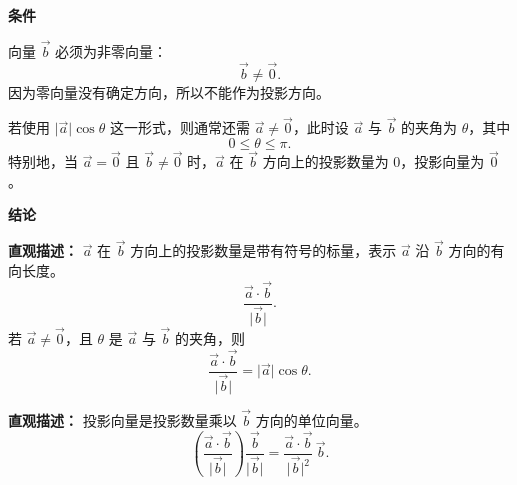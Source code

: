 \begin{statementbox}

	\textbf{\textcolor{CStatement}{条件}}
	\begin{description}[style=nextline, leftmargin=2.8em, labelsep=0.5em, itemsep=0.35em]
		\item[\textbf{\textcolor{CStatement}{条件1（投影方向非零）：}}] 向量 $\vec b$ 必须为非零向量：
		      \[
			      \vec b \neq \vec 0.
		      \]
		      因为零向量没有确定方向，所以不能作为投影方向。

		\item[\textbf{\textcolor{CStatement}{条件2（夹角公式前提）：}}] 若使用 $\lvert\vec a\rvert\cos\theta$ 这一形式，则通常还需 $\vec a\neq \vec 0$，此时设 $\vec a$ 与 $\vec b$ 的夹角为 $\theta$，其中
		      \[
			      0 \le \theta \le \pi.
		      \]
		      特别地，当 $\vec a=\vec 0$ 且 $\vec b\neq\vec 0$ 时，$\vec a$ 在 $\vec b$ 方向上的投影数量为 $0$，投影向量为 $\vec 0$。
	\end{description}

	\textbf{\textcolor{CStatement}{结论}}
	\begin{description}[style=nextline, leftmargin=2.8em, labelsep=0.5em, itemsep=0.45em]
		\item[\textbf{\textcolor{CStatement}{结论一（投影数量）：}}]
		      \textbf{\textcolor{CStatement}{直观描述：}} $\vec a$ 在 $\vec b$ 方向上的投影数量是带有符号的标量，表示 $\vec a$ 沿 $\vec b$ 方向的有向长度。
		      \[
			      \frac{\vec a\cdot\vec b}{\lvert\vec b\rvert}.
		      \]
		      若 $\vec a\neq\vec 0$，且 $\theta$ 是 $\vec a$ 与 $\vec b$ 的夹角，则
		      \[
			      \frac{\vec a\cdot\vec b}{\lvert\vec b\rvert}
			      =
			      \lvert\vec a\rvert\cos\theta .
		      \]

		\item[\textbf{\textcolor{CStatement}{推广结论（投影向量）：}}]
		      \textbf{\textcolor{CStatement}{直观描述：}} 投影向量是投影数量乘以 $\vec b$ 方向的单位向量。
		      \[
			      \left(\frac{\vec a\cdot\vec b}{\lvert\vec b\rvert}\right)\frac{\vec b}{\lvert\vec b\rvert}
			      =
			      \frac{\vec a\cdot\vec b}{\lvert\vec b\rvert^2}\,\vec b.
		      \]
	\end{description}

\end{statementbox}